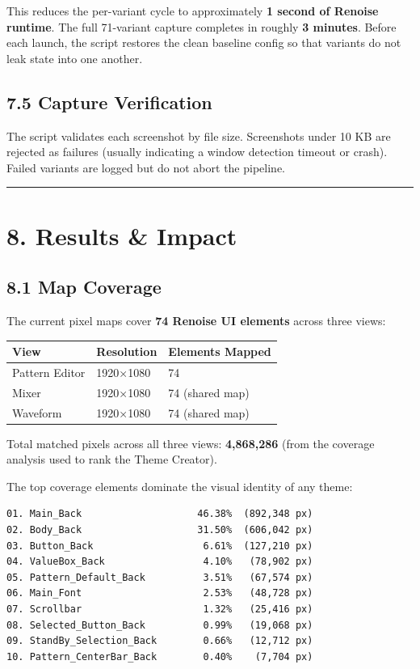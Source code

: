 \documentclass[
  11pt,
  oneside]{report}
\begin{document}
This reduces the per-variant cycle to approximately \textbf{1 second of
Renoise runtime}. The full 71-variant capture completes in roughly
\textbf{3 minutes}. Before each launch, the script restores the clean
baseline config so that variants do not leak state into one another.

\subsection{7.5 Capture Verification}\label{capture-verification}

The script validates each screenshot by file size. Screenshots under 10
KB are rejected as failures (usually indicating a window detection
timeout or crash). Failed variants are logged but do not abort the
pipeline.

\begin{center}\rule{0.5\linewidth}{0.5pt}\end{center}

\section{8. Results \& Impact}\label{results-impact}

\subsection{8.1 Map Coverage}\label{map-coverage}

The current pixel maps cover \textbf{74 Renoise UI elements} across
three views:

\begin{longtable}[]{@{}lll@{}}
\toprule\noalign{}
View & Resolution & Elements Mapped \\
\midrule\noalign{}
\endhead
\bottomrule\noalign{}
\endlastfoot
Pattern Editor & 1920×1080 & 74 \\
Mixer & 1920×1080 & 74 (shared map) \\
Waveform & 1920×1080 & 74 (shared map) \\
\end{longtable}

Total matched pixels across all three views: \textbf{4,868,286} (from
the coverage analysis used to rank the Theme Creator).

The top coverage elements dominate the visual identity of any theme:

\begin{verbatim}
01. Main_Back                    46.38%  (892,348 px)
02. Body_Back                    31.50%  (606,042 px)
03. Button_Back                   6.61%  (127,210 px)
04. ValueBox_Back                 4.10%   (78,902 px)
05. Pattern_Default_Back          3.51%   (67,574 px)
06. Main_Font                     2.53%   (48,728 px)
07. Scrollbar                     1.32%   (25,416 px)
08. Selected_Button_Back          0.99%   (19,068 px)
09. StandBy_Selection_Back        0.66%   (12,712 px)
10. Pattern_CenterBar_Back        0.40%    (7,704 px)
\end{verbatim}
\end{document}

